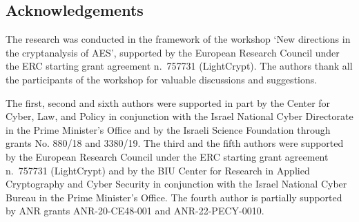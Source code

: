 \documentclass[runningheads]{llncs}
\begin{document}











\subsection*{Acknowledgements}
The research was conducted in the framework of the workshop `New directions in the cryptanalysis of AES', supported by the European Research Council under the ERC starting grant agreement n.~757731 (LightCrypt). The authors thank all the participants of the workshop for valuable discussions and suggestions.

The first, second and sixth authors were supported in part by the Center for Cyber, Law, and Policy in conjunction with the Israel National Cyber Directorate in the Prime Minister’s Office and by the Israeli Science Foundation through grants No. 880/18 and 3380/19. The third and the fifth authors were supported by the European Research Council under the ERC starting grant agreement n.~757731 (LightCrypt) and by the BIU Center for Research in Applied Cryptography and Cyber Security in conjunction with the Israel National Cyber Bureau in the Prime Minister's Office.
The fourth author is partially supported by ANR grants  ANR-20-CE48-001 and ANR-22-PECY-0010.



\end{document}
